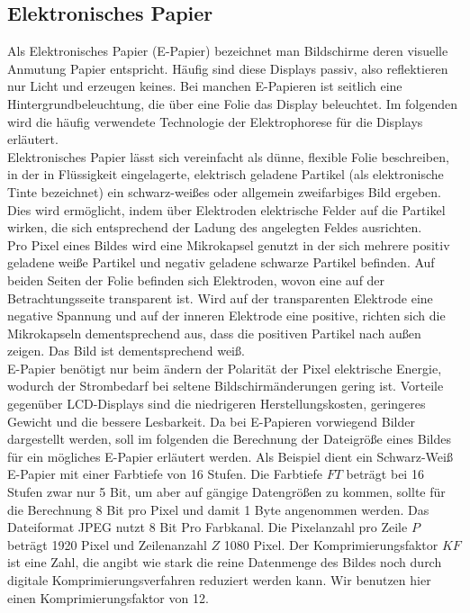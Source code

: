 \subsection{Elektronisches Papier}
Als Elektronisches Papier (E-Papier) bezeichnet man Bildschirme deren visuelle Anmutung Papier entspricht. Häufig sind diese Displays passiv, also reflektieren nur Licht und erzeugen keines. Bei manchen E-Papieren ist seitlich eine Hintergrundbeleuchtung, die über eine Folie das Display beleuchtet. Im folgenden wird die häufig verwendete Technologie der Elektrophorese für die Displays erläutert. \\
\glqq Elektronisches Papier lässt sich vereinfacht als dünne, flexible Folie beschreiben, in der in Flüssigkeit eingelagerte, elektrisch geladene Partikel (als elektronische Tinte bezeichnet) ein schwarz-weißes oder allgemein zweifarbiges Bild ergeben. Dies wird ermöglicht, indem über Elektroden elektrische Felder auf die Partikel wirken, die sich entsprechend der Ladung des angelegten Feldes ausrichten. \grqq \cite[Seite 568]{Schryen.2002} \\
Pro Pixel eines Bildes wird eine Mikrokapsel genutzt in der sich mehrere positiv geladene weiße Partikel und negativ geladene schwarze Partikel befinden. Auf beiden Seiten der Folie befinden sich Elektroden, wovon eine auf der Betrachtungsseite transparent ist. Wird auf der transparenten Elektrode eine negative Spannung und auf der inneren Elektrode eine positive, richten sich die Mikrokapseln dementsprechend aus, dass die positiven Partikel nach außen zeigen. Das Bild ist dementsprechend weiß. \cite[Vgl. Seite 567 f.]{Schryen.2002} \\
E-Papier benötigt nur beim ändern der Polarität der Pixel elektrische Energie, wodurch der Strombedarf bei seltene Bildschirmänderungen gering ist.
Vorteile gegenüber LCD-Displays sind die niedrigeren Herstellungskosten, geringeres Gewicht und die bessere Lesbarkeit. \cite[Vgl. Seite 569]{Schryen.2002}
Da bei E-Papieren vorwiegend Bilder dargestellt werden, soll im folgenden die Berechnung der Dateigröße eines Bildes für ein mögliches E-Papier erläutert werden.
Als Beispiel dient ein Schwarz-Weiß E-Papier mit einer Farbtiefe von 16 Stufen. Die Farbtiefe $ FT $ beträgt bei 16 Stufen zwar nur 5 Bit, um aber auf gängige Datengrößen zu kommen, sollte für die Berechnung 8 Bit pro Pixel und damit 1 Byte angenommen werden. Das Dateiformat JPEG  nutzt 8 Bit Pro Farbkanal. Die Pixelanzahl pro Zeile $ P $ beträgt 1920 Pixel und Zeilenanzahl $ Z $ 1080 Pixel. Der Komprimierungsfaktor $ KF $ ist eine Zahl, die angibt wie stark die reine Datenmenge des Bildes noch durch digitale Komprimierungsverfahren reduziert werden kann. Wir benutzen hier einen Komprimierungsfaktor von 12. \cite[Vgl. Seite 22]{Buhler.2018}
